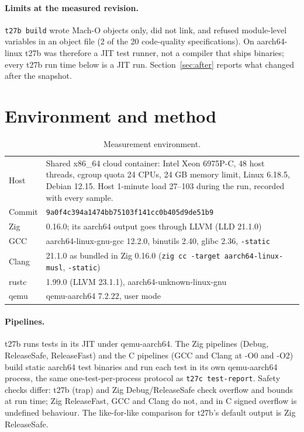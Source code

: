 \documentclass[11pt,a4paper]{article}
\begin{document}
\paragraph{Limits at the measured revision.}
\texttt{t27b build} wrote Mach-O objects only, did not link, and refused
module-level variables in an object file (2 of the 20 code-quality
specifications). On aarch64-linux t27b was therefore a JIT test runner,
not a compiler that ships binaries; every t27b run time below is a JIT run.
Section~\ref{sec:after} reports what changed after the snapshot.

\section{Environment and method}

\begin{table}[h]
\centering
\small
\begin{tabularx}{\linewidth}{@{}lY@{}}
\toprule
Host & Shared x86\_64 cloud container: Intel Xeon 6975P-C, 48 host threads, cgroup quota 24 CPUs, 24 GB memory limit, Linux 6.18.5, Debian 12.15. Host 1-minute load 27--103 during the run, recorded with every sample. \\
Commit & \texttt{9a0f4c394a1474bb75103f141cc0b405d9de51b9} \\
Zig & 0.16.0; its aarch64 output goes through LLVM (LLD 21.1.0) \\
GCC & aarch64-linux-gnu-gcc 12.2.0, binutils 2.40, glibc 2.36, \texttt{-static} \\
Clang & 21.1.0 as bundled in Zig 0.16.0 (\texttt{zig cc -target aarch64-linux-musl}, \texttt{-static}) \\
rustc & 1.99.0 (LLVM 23.1.1), aarch64-unknown-linux-gnu \\
qemu & qemu-aarch64 7.2.22, user mode \\
\bottomrule
\end{tabularx}
\caption{Measurement environment.}
\label{tab:env}
\end{table}

\paragraph{Pipelines.}
t27b runs tests in its JIT under qemu-aarch64. The Zig pipelines (Debug,
ReleaseSafe, ReleaseFast) and the C pipelines (GCC and Clang at -O0 and
-O2) build static aarch64 test binaries and run each test in its own
qemu-aarch64 process, the same one-test-per-process protocol as
\texttt{t27c test-report}. Safety checks differ: t27b (trap) and Zig
Debug/ReleaseSafe check overflow and bounds at run time; Zig ReleaseFast,
GCC and Clang do not, and in C signed overflow is undefined behaviour. The
like-for-like comparison for t27b's default output is Zig ReleaseSafe.
\end{document}
